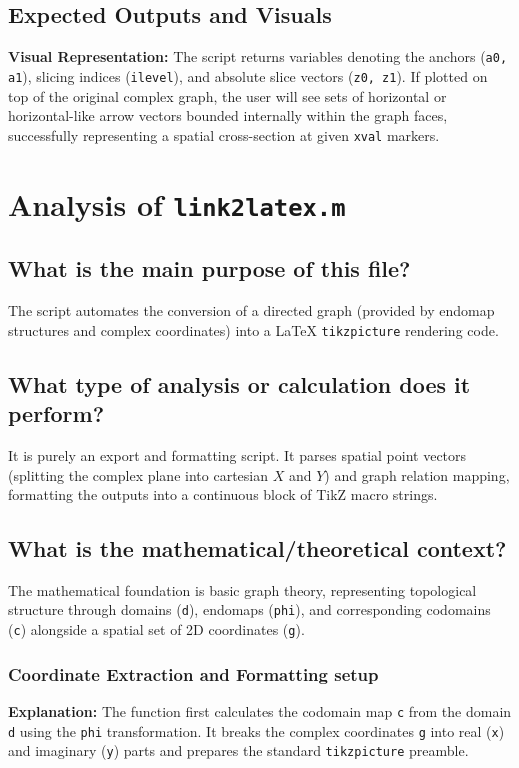 \section{Expected Outputs and Visuals}
\textbf{Visual Representation:} The script returns variables denoting the anchors (\texttt{a0, a1}), slicing indices (\texttt{ilevel}), and absolute slice vectors (\texttt{z0, z1}). If plotted on top of the original complex graph, the user will see sets of horizontal or horizontal-like arrow vectors bounded internally within the graph faces, successfully representing a spatial cross-section at given \texttt{xval} markers.


\newpage
\chapter{Analysis of \texttt{link2latex.m}}

\section{What is the main purpose of this file?}
The script automates the conversion of a directed graph (provided by endomap structures and complex coordinates) into a LaTeX \texttt{tikzpicture} rendering code. 

\section{What type of analysis or calculation does it perform?}
It is purely an export and formatting script. It parses spatial point vectors (splitting the complex plane into cartesian $X$ and $Y$) and graph relation mapping, formatting the outputs into a continuous block of TikZ macro strings.

\section{What is the mathematical/theoretical context?}
The mathematical foundation is basic graph theory, representing topological structure through domains (\texttt{d}), endomaps (\texttt{phi}), and corresponding codomains (\texttt{c}) alongside a spatial set of 2D coordinates (\texttt{g}).

\subsection{Coordinate Extraction and Formatting setup}
\textbf{Explanation:} 
The function first calculates the codomain map \texttt{c} from the domain \texttt{d} using the \texttt{phi} transformation. It breaks the complex coordinates \texttt{g} into real (\texttt{x}) and imaginary (\texttt{y}) parts and prepares the standard \texttt{tikzpicture} preamble.


